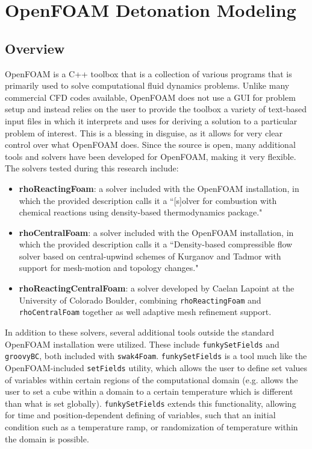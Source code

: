 \chapter{OpenFOAM Detonation Modeling}
\label{ofchap}


\section{Overview}
OpenFOAM is a C++ toolbox that is a collection of various programs that is primarily used to solve computational fluid dynamics problems. Unlike many commercial CFD codes available, OpenFOAM does not use a GUI for problem setup and instead relies on the user to provide the toolbox a variety of text-based input files in which it interprets and uses for deriving a solution to a particular problem of interest. This is a blessing in disguise, as it allows for very clear control over what OpenFOAM does. Since the source is open, many additional tools and solvers have been developed for OpenFOAM, making it very flexible. The solvers tested during this research include:
\begin{itemize}
    \item \textbf{rhoReactingFoam}: a solver included with the OpenFOAM installation, in which the provided description calls it a ``[s]olver for combustion with chemical reactions using density-based thermodynamics package."
    \item \textbf{rhoCentralFoam}: a solver included with the OpenFOAM installation, in which the provided description calls it a ``Density-based compressible flow solver based on central-upwind schemes of Kurganov and Tadmor with support for mesh-motion and topology changes."
    \item \textbf{rhoReactingCentralFoam}: a solver developed by Caelan Lapoint at the University of Colorado Boulder, combining \verb|rhoReactingFoam| and \verb|rhoCentralFoam| together as well adaptive mesh refinement support. 
\end{itemize}

In addition to these solvers, several additional tools outside the standard OpenFOAM installation were utilized. These include \verb|funkySetFields| and \verb|groovyBC|, both included with \verb|swak4Foam|. \verb|funkySetFields| is a tool much like the OpenFOAM-included \verb|setFields| utility, which allows the user to define set values of variables within certain regions of the computational domain (e.g. allows the user to set a cube within a domain to a certain temperature which is different than what is set globally). \verb|funkySetFields| extends this functionality, allowing for time and position-dependent defining of variables, such that an initial condition such as a temperature ramp, or randomization of temperature within the domain is possible. 

